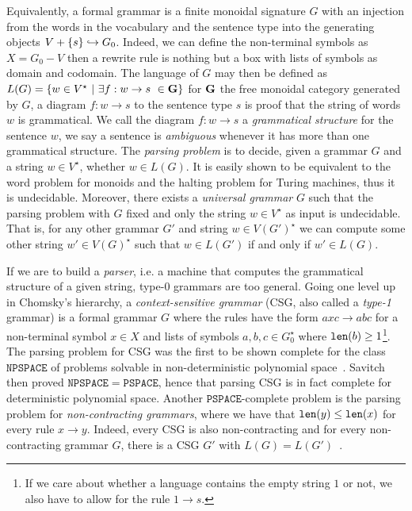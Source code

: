 Equivalently, a formal grammar is a finite monoidal signature $G$ with an injection from the words in the vocabulary and the sentence type into the generating objects $V + \{ s \} \hookrightarrow G_0$.
Indeed, we can define the non-terminal symbols as $X = G_0 - V$ then a rewrite rule is nothing but a box with lists of symbols as domain and codomain.
The language of $G$ may then be defined as $L(G) = \{ w \in V^\star \ \vert \ \exists f : w \to s \ \in \mathbf{G} \}$ for $\mathbf{G}$ the free monoidal category generated by $G$, a diagram $f : w \to s$ to the sentence type $s$ is proof that the string of words $w$ is grammatical.
We call the diagram $f : w \to s$ a \emph{grammatical structure} for the sentence $w$, we say a sentence is \emph{ambiguous} whenever it has more than one grammatical structure.
The \emph{parsing problem} is to decide, given a grammar $G$ and a string $w \in V^\star$, whether $w \in L(G)$.
It is easily shown to be equivalent to the word problem for monoids and the halting problem for Turing machines, thus it is undecidable.
Moreover, there exists a \emph{universal grammar} $G$ such that the parsing problem with $G$ fixed and only the string $w \in V^\star$ as input is undecidable.
That is, for any other grammar $G'$ and string $w \in V(G')^\star$ we can compute some other string $w' \in V(G)^\star$ such that $w \in L(G')$ if and only if $w' \in L(G)$.

If we are to build a \emph{parser}, i.e. a machine that computes the grammatical structure of a given string, type-0 grammars are too general.
Going one level up in Chomsky's hierarchy, a \emph{context-sensitive grammar} (CSG, also called a \emph{type-1} grammar) is a formal grammar $G$ where the rules have the form $a x c \to a b c$ for a non-terminal symbol $x \in X$ and lists of symbols $a, b, c \in G_0^\star$ where $\mathtt{len}(b) \geq 1$\footnote
{If we care about whether a language contains the empty string $1$ or not, we also have to allow for the rule $1 \to s$.}.
The parsing problem for CSG was the first to be shown complete for the class $\mathtt{NPSPACE}$ of problems solvable in non-deterministic polynomial space~\cite{Kuroda64}.
Savitch~\cite{Savitch70} then proved $\mathtt{NPSPACE} = \mathtt{PSPACE}$, hence that parsing CSG is in fact complete for deterministic polynomial space.
Another $\mathtt{PSPACE}$-complete problem is the parsing problem for \emph{non-contracting grammars}, where we have that $\mathtt{len}(y) \leq \mathtt{len}(x)$ for every rule $x \to y$.
Indeed, every CSG is also non-contracting and for every non-contracting grammar $G$, there is a CSG $G'$ with $L(G) = L(G')$~\cite[Theorem~11]{Chomsky63}.

